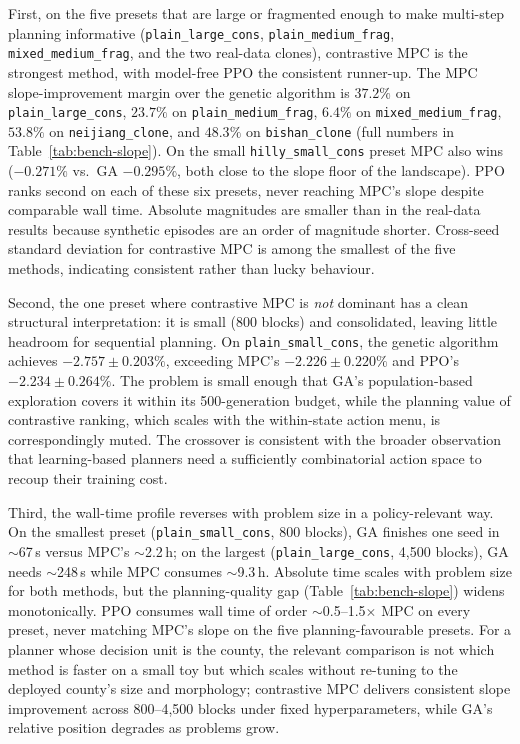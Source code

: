 \documentclass[11pt]{article}
\begin{document}
First, on the five presets that are large or fragmented enough to make multi-step planning informative (\texttt{plain\_large\_cons}, \texttt{plain\_medium\_frag}, \texttt{mixed\_medium\_frag}, and the two real-data clones), contrastive MPC is the strongest method, with model-free PPO the consistent runner-up. The MPC slope-improvement margin over the genetic algorithm is $37.2\%$ on \texttt{plain\_large\_cons}, $23.7\%$ on \texttt{plain\_medium\_frag}, $6.4\%$ on \texttt{mixed\_medium\_frag}, $53.8\%$ on \texttt{neijiang\_clone}, and $48.3\%$ on \texttt{bishan\_clone} (full numbers in Table~\ref{tab:bench-slope}). On the small \texttt{hilly\_small\_cons} preset MPC also wins ($-0.271\%$ vs.\ GA $-0.295\%$, both close to the slope floor of the landscape). PPO ranks second on each of these six presets, never reaching MPC's slope despite comparable wall time. Absolute magnitudes are smaller than in the real-data results because synthetic episodes are an order of magnitude shorter. Cross-seed standard deviation for contrastive MPC is among the smallest of the five methods, indicating consistent rather than lucky behaviour.

Second, the one preset where contrastive MPC is \emph{not} dominant has a clean structural interpretation: it is small (800 blocks) and consolidated, leaving little headroom for sequential planning. On \texttt{plain\_small\_cons}, the genetic algorithm achieves $-2.757 \pm 0.203\%$, exceeding MPC's $-2.226 \pm 0.220\%$ and PPO's $-2.234 \pm 0.264\%$. The problem is small enough that GA's population-based exploration covers it within its 500-generation budget, while the planning value of contrastive ranking, which scales with the within-state action menu, is correspondingly muted. The crossover is consistent with the broader observation that learning-based planners need a sufficiently combinatorial action space to recoup their training cost.

Third, the wall-time profile reverses with problem size in a policy-relevant way. On the smallest preset (\texttt{plain\_small\_cons}, 800 blocks), GA finishes one seed in $\sim$67\,s versus MPC's $\sim$2.2\,h; on the largest (\texttt{plain\_large\_cons}, 4{,}500 blocks), GA needs $\sim$248\,s while MPC consumes $\sim$9.3\,h. Absolute time scales with problem size for both methods, but the planning-quality gap (Table~\ref{tab:bench-slope}) widens monotonically. PPO consumes wall time of order $\sim$0.5--1.5$\times$ MPC on every preset, never matching MPC's slope on the five planning-favourable presets. For a planner whose decision unit is the county, the relevant comparison is not which method is faster on a small toy but which scales without re-tuning to the deployed county's size and morphology; contrastive MPC delivers consistent slope improvement across 800--4{,}500 blocks under fixed hyperparameters, while GA's relative position degrades as problems grow.
\end{document}
